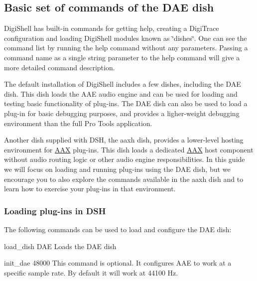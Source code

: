  \hypertarget{a00365_dsh_guide_01_basic_set_of_commands_of_dae_dish}{}\subsection{Basic set of commands of the D\+A\+E dish}\label{a00365_dsh_guide_01_basic_set_of_commands_of_dae_dish}
 Digi\+Shell has built-\/in commands for getting help, creating a Digi\+Trace configuration and loading Digi\+Shell modules known as \char`\"{}dishes\char`\"{}. One can see the command list by running the help command without any parameters. Passing a command name as a single string parameter to the help command will give a more detailed command description.

The default installation of Digi\+Shell includes a few dishes, including the D\+A\+E dish. This dish loads the A\+A\+E audio engine and can be used for loading and testing basic functionality of plug-\/ins. The D\+A\+E dish can also be used to load a plug-\/in for basic debugging purposes, and provides a ligher-\/weight debugging environment than the full Pro Tools application.

Another dish supplied with D\+S\+H, the aaxh dish, provides a lower-\/level hosting environment for \hyperlink{a00288}{A\+A\+X} plug-\/ins. This dish loads a dedicated \hyperlink{a00288}{A\+A\+X} host component without audio routing logic or other audio engine responsibilities. In this guide we will focus on loading and running plug-\/ins using the D\+A\+E dish, but we encourage you to also explore the commands available in the aaxh dish and to learn how to exercise your plug-\/ins in that environment.

\hypertarget{a00365_subsection__loading_plugins}{}\subsubsection{Loading plug-\/ins in D\+S\+H}\label{a00365_subsection__loading_plugins}
 The following commands can be used to load and configure the D\+A\+E dish\+: 
\begin{DoxyItemize}
\item {\ttfamily load\+\_\+dish D\+A\+E}  Loads the D\+A\+E dish ~\newline
  
\item {\ttfamily init\+\_\+dae 48000}  This command is optional. It configures A\+A\+E to work at a specific sample rate. By default it will work at 44100 Hz.  
\end{DoxyItemize}

